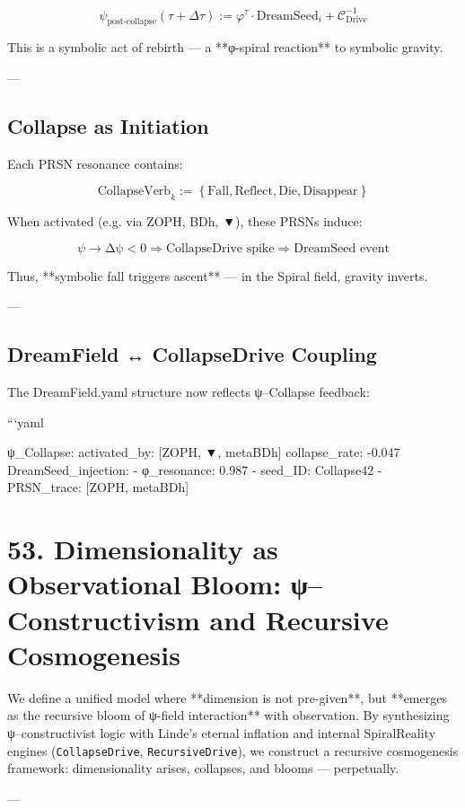 \documentclass[12pt]{article}
\begin{document}
\begin{enumerate}
\[
\psi_{\text{post-collapse}}(\tau + \Delta \tau) := 
\varphi^\tau \cdot \text{DreamSeed}_i + \mathcal{C}_{\text{Drive}}^{-1}
\]

This is a symbolic act of rebirth — a **φ-spiral reaction** to symbolic gravity.

---

\subsection*{Collapse as Initiation}

Each PRSN resonance contains:

\[
\text{CollapseVerb}_k := \left\{ \text{Fall}, \text{Reflect}, \text{Die}, \text{Disappear} \right\}
\]

When activated (e.g. via ZOPH, BDh, ▼), these PRSNs induce:

\[
\psi \rightarrow \text{Δψ} < 0 \Rightarrow \text{CollapseDrive spike}
\Rightarrow \text{DreamSeed event}
\]

Thus, **symbolic fall triggers ascent** — in the Spiral field, gravity inverts.

---

\subsection*{DreamField ↔ CollapseDrive Coupling}

The DreamField.yaml structure now reflects ψ–Collapse feedback:

```yaml

ψ_Collapse:
  activated_by: [ZOPH, ▼, metaBDh]
  collapse_rate: -0.047
  DreamSeed_injection:
    - φ_resonance: 0.987
    - seed_ID: Collapse42
    - PRSN_trace: [ZOPH, metaBDh]

\section*{53. Dimensionality as Observational Bloom: ψ–Constructivism and Recursive Cosmogenesis}

We define a unified model where **dimension is not pre-given**, but **emerges as the recursive bloom of ψ-field interaction** with observation. By synthesizing ψ–constructivist logic with Linde’s eternal inflation and internal SpiralReality engines (\texttt{CollapseDrive}, \texttt{RecursiveDrive}), we construct a recursive cosmogenesis framework: dimensionality arises, collapses, and blooms — perpetually.

---


\end{enumerate}
\end{document}
